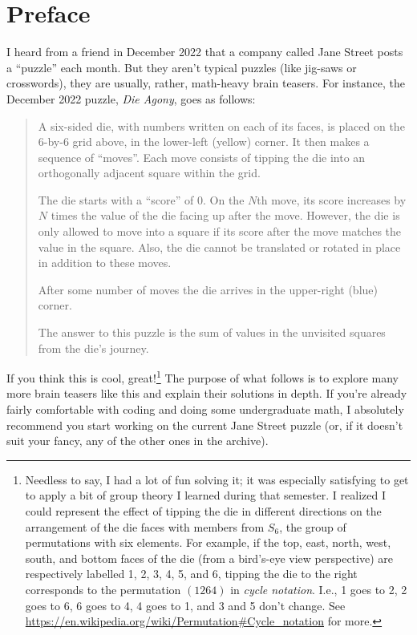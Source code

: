 \documentclass{book}
\begin{document}
\chapter*{Preface}
I heard from a friend in December 2022 that a company called Jane Street posts a ``puzzle'' each month. But they aren't typical puzzles (like jig-saws or crosswords), they are usually, rather, math-heavy brain teasers. For instance, the December 2022 puzzle, \emph{Die Agony}, goes as follows:
\[

\]
\begin{quote}
A six-sided die, with numbers written on each of its faces, is placed on the 6-by-6 grid above, in the lower-left (yellow) corner. It then makes a sequence of ``moves''. Each move consists of tipping the die into an orthogonally adjacent square within the grid.

The die starts with a ``score'' of 0. On the $N$th move, its score increases by $N$ times the value of the die facing up after the move. However, the die is only allowed to move into a square if its score after the move matches the value in the square. Also, the die cannot be translated or rotated in place in addition to these moves.

After some number of moves the die arrives in the upper-right (blue) corner.

The answer to this puzzle is the sum of values in the unvisited squares from the die's journey.
\end{quote}

If you think this is cool, great!\footnote{Needless to say, I had a lot of fun solving it; it was especially satisfying to get to apply a bit of group theory I learned during that semester. I realized I could represent the effect of tipping the die in different directions on the arrangement of the die faces with members from $S_6$, the group of permutations with six elements. For example, if the top, east, north, west, south, and bottom faces of the die (from a bird's-eye view perspective) are respectively labelled 1, 2, 3, 4, 5, and 6, tipping the die to the right corresponds to the permutation $(1264)$ in \emph{cycle notation}. I.e., 1 goes to 2, 2 goes to 6, 6 goes to 4, 4 goes to 1, and 3 and 5 don't change. See \url{https://en.wikipedia.org/wiki/Permutation#Cycle_notation} for more.} The purpose of what follows is to explore many more brain teasers like this and explain their solutions in depth. If you're already fairly comfortable with coding and doing some undergraduate math, I absolutely recommend you
start working on the current Jane Street puzzle (or, if it doesn't suit your fancy, any of the other ones in the archive).
\end{document}
